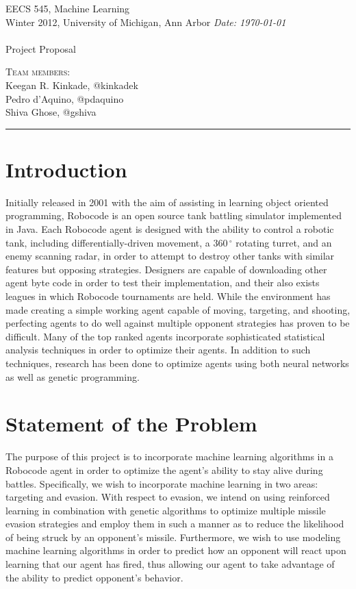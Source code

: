 \documentclass{article}
\newcommand{\shortbar}{\begin{center}\rule{5ex}{0.1pt}\end{center}}
\newcommand{\courseNumber}{EECS 545}
\newcommand{\courseTitle}{Machine Learning}
\newcommand{\semester}{Winter 2012}
\theoremstyle{plain}
\theoremstyle{definition}
\theoremstyle{remark}
\newenvironment{solution}[1]{\medskip\noindent{\bf Problem #1.~}}{\shortbar}
\newcommand{\solutions}[4]{
\vspace{-2ex}
\begin{center}
{\small  \courseNumber, \courseTitle
\hfill {\Large \bf {#1} }\\
\semester, University of Michigan, Ann Arbor \hfill
{\em Date: #3}}\\
\vspace{-1ex}
\hrulefill\\
\vspace{4ex}
{\LARGE Project Proposal #2}\\
\vspace{2ex}
\end{center}
\begin{trivlist}
\item \textsc{Team members:} {#4}
\end{trivlist}
\noindent
\shortbar
\vspace{3ex}
}
\begin{document}
\solutions{}{}{\today}{\\ Keegan R. Kinkade, @kinkadek\\ Pedro d'Aquino, @pdaquino \\Shiva Ghose, @gshiva }
%
%

\section*{Introduction}

Initially released in 2001 with the aim of assisting in learning object oriented programming, Robocode is an open source tank battling simulator implemented in Java. Each Robocode agent is designed with the ability to control a robotic tank, including differentially-driven movement, a $360\,^{\circ}\mathrm{}$ rotating turret, and an enemy scanning radar, in order to attempt to destroy other tanks with similar features but opposing strategies. Designers are capable of downloading other agent byte code in order to test their implementation, and their also exists leagues in which Robocode tournaments are held. While the environment has made creating a simple working agent capable of moving, targeting, and shooting, perfecting agents to do well against multiple opponent strategies has proven to be difficult. Many of the top ranked agents incorporate sophisticated statistical analysis techniques in order to optimize their agents. In addition to such techniques, research has been done to optimize agents using both neural networks as well as genetic programming. 

\section*{Statement of the Problem}

The purpose of this project is to incorporate machine learning algorithms in a Robocode agent in order to optimize the agent's ability to stay alive during battles. Specifically, we wish to incorporate machine learning in two areas: targeting and evasion. With respect to evasion, we intend on using reinforced learning in combination with genetic algorithms to optimize multiple missile evasion strategies and employ them in such a manner as to reduce the likelihood of being struck by an opponent's missile. Furthermore, we wish to use modeling machine learning algorithms in order to predict how an opponent will react upon learning that our agent has fired, thus allowing our agent to take advantage of the ability to predict opponent's behavior. 
\end{document}
